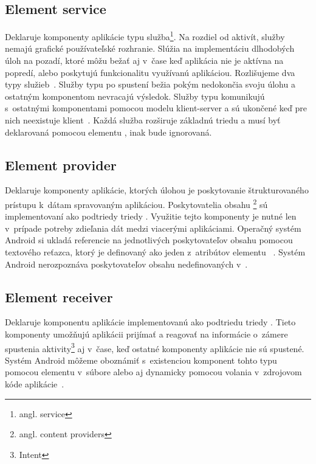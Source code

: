 \subsection{Element service}
Deklaruje komponenty aplikácie typu služba\footnote{angl. service}. Na rozdiel od aktivít, služby nemajú grafické používateľské rozhranie. Slúžia na implementáciu dlhodobých úloh na pozadí, ktoré môžu bežať aj v~čase keď aplikácia nie je aktívna na popredí, alebo poskytujú funkcionalitu využívanú aplikáciou. Rozlišujeme dva typy služieb~\cite{elService}. Služby typu  po spustení bežia pokým nedokončia svoju úlohu a ostatným komponentom nevracajú výsledok. Služby typu  komunikujú s~ostatnými komponentami pomocou modelu klient-server a sú ukončené keď pre nich neexistuje klient~\cite{boundService}. Každá služba rozširuje základnú triedu  a musí byť deklarovaná pomocou elementu , inak bude ignorovaná.

\subsection{Element provider}
Deklaruje komponenty aplikácie, ktorých úlohou je poskytovanie štrukturovaného prístupu k~dátam spravovaným aplikáciou. Poskytovatelia obsahu \footnote{angl. content providers} sú implementovaní ako podtriedy triedy . Využitie tejto komponenty je nutné len v~prípade potreby zdieľania dát medzi viacerými aplikáciami. Operačný systém Android si ukladá referencie na jednotlivých poskytovateľov obsahu pomocou  textového reťazca, ktorý je definovaný ako jeden z~atribútov elementu ~\cite{elContentProvider}. Systém Android nerozpoznáva poskytovateľov obsahu nedefinovaných v~.

\subsection{Element receiver}
Deklaruje komponentu aplikácie implementovanú ako podtriedu triedy . Tieto komponenty umožňujú aplikácii prijímať a reagovať na informácie o~zámere spustenia aktivity\footnote{Intent} aj v~čase, keď ostatné komponenty aplikácie nie sú spustené. Systém Android môžeme oboznámiť s~existenciou komponent tohto typu pomocou elementu  v~súbore  alebo aj dynamicky pomocou volania  v~zdrojovom kóde aplikácie~\cite{elReceiver}.

